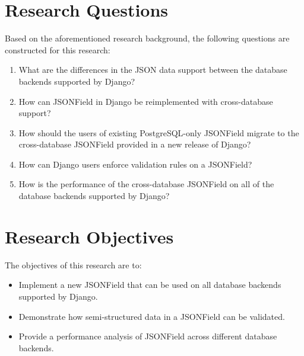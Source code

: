 \section{Research Questions}

Based on the aforementioned research background, the following questions are
constructed for this research:

\begin{enumerate}
    \item What are the differences in the JSON data support between the
          database backends supported by Django?
    \item How can JSONField in Django be reimplemented with cross-database
          support?
    \item How should the users of existing PostgreSQL-only JSONField migrate to
          the cross-database JSONField provided in a new release of Django?
    \item How can Django users enforce validation rules on a JSONField?
    \item How is the performance of the cross-database JSONField on all of the
          database backends supported by Django?
\end{enumerate}

\section{Research Objectives}

The objectives of this research are to:

\begin{itemize}
    \item Implement a new JSONField that can be used on all database backends
          supported by Django.
    \item Demonstrate how semi-structured data in a JSONField can be validated.
    \item Provide a performance analysis of JSONField across different database
          backends.
\end{itemize}

